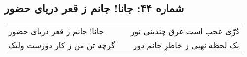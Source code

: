 \begin{center}
\section*{شماره ۴۴: جانا! جانم ز قعر دریای حضور}
\label{sec:044}
\begin{longtable}{l p{0.5cm} r}
جانا! جانم ز قعر دریای حضور
&&
دُرّی عجب است غرق چندینی نور
\\
گرچه تن من ز کار دورست ولیک
&&
یک لحظه نهیی ز خاطرِ جانم دور
\\
\end{longtable}
\end{center}
